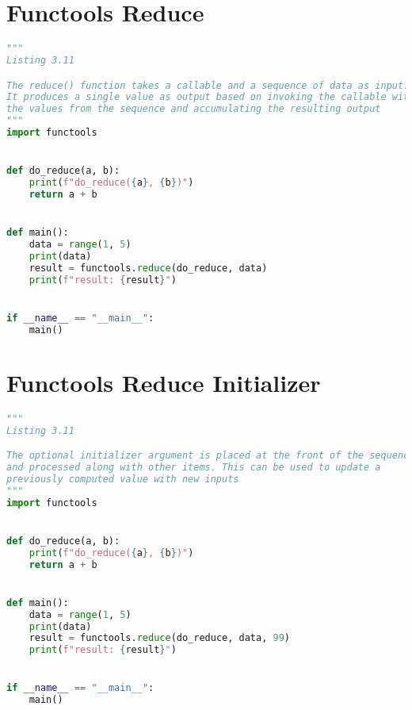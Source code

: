 \documentclass[a4paper,landscape]{report}
\begin{document}
\section{Functools Reduce}
\begin{lstlisting}[language=Python]
"""
Listing 3.11

The reduce() function takes a callable and a sequence of data as input.
It produces a single value as output based on invoking the callable with
the values from the sequence and accumulating the resulting output
"""
import functools


def do_reduce(a, b):
    print(f"do_reduce({a}, {b})")
    return a + b


def main():
    data = range(1, 5)
    print(data)
    result = functools.reduce(do_reduce, data)
    print(f"result: {result}")


if __name__ == "__main__":
    main()

\end{lstlisting}
\section{Functools Reduce Initializer}
\begin{lstlisting}[language=Python]
"""
Listing 3.11

The optional initializer argument is placed at the front of the sequence
and processed along with other items. This can be used to update a
previously computed value with new inputs
"""
import functools


def do_reduce(a, b):
    print(f"do_reduce({a}, {b})")
    return a + b


def main():
    data = range(1, 5)
    print(data)
    result = functools.reduce(do_reduce, data, 99)
    print(f"result: {result}")


if __name__ == "__main__":
    main()

\end{lstlisting}
\end{document}
